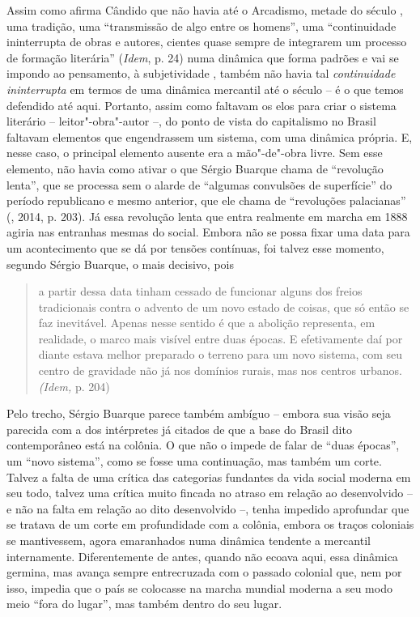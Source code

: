 Assim como afirma Cândido que não havia até o Arcadismo, metade do
século , uma tradição, uma ``transmissão de algo entre os homens'',
uma ``continuidade ininterrupta de obras e autores, cientes quase sempre
de integrarem um processo de formação literária'' (\emph{Idem}, p. 24)
numa dinâmica que forma padrões e vai se impondo ao pensamento, à
subjetividade , também não havia tal \emph{continuidade ininterrupta} em
termos de uma dinâmica mercantil até o século  -- é o que temos
defendido até aqui. Portanto, assim como faltavam os elos para criar o
sistema literário -- leitor"-obra"-autor --, do ponto de vista do
capitalismo no Brasil faltavam elementos que engendrassem um sistema,
com uma dinâmica própria. E, nesse caso, o principal elemento ausente
era a mão"-de"-obra livre. Sem esse elemento, não havia como ativar o que
Sérgio Buarque chama de ``revolução lenta'', que se processa sem o
alarde de ``algumas convulsões de superfície'' do período republicano e
mesmo anterior, que ele chama de ``revoluções palacianas'' (,
2014, p. 203). Já essa revolução lenta que entra realmente em marcha em
1888 agiria nas entranhas mesmas do social. Embora não se possa fixar
uma data para um acontecimento que se dá por tensões contínuas, foi
talvez esse momento, segundo Sérgio Buarque, o mais decisivo, pois

\begin{quote}
a partir dessa data tinham cessado de funcionar alguns dos freios
tradicionais contra o advento de um novo estado de coisas, que só então
se faz inevitável. Apenas nesse sentido é que a abolição representa, em
realidade, o marco mais visível entre duas épocas. E efetivamente daí
por diante estava melhor preparado o terreno para um novo sistema, com
seu centro de gravidade não já nos domínios rurais, mas nos centros
urbanos. \emph{(Idem,} p. 204)
\end{quote}

Pelo trecho, Sérgio Buarque parece também ambíguo -- embora sua visão
seja parecida com a dos intérpretes já citados de que a base do Brasil
dito contemporâneo está na colônia. O que não o impede de falar de
``duas épocas'', um ``novo sistema'', como se fosse uma continuação, mas
também um corte. Talvez a falta de uma crítica das categorias fundantes
da vida social moderna em seu todo, talvez uma crítica muito fincada no
atraso em relação ao desenvolvido -- e não na falta em relação ao dito
desenvolvido --, tenha impedido aprofundar que se tratava de um corte em
profundidade com a colônia, embora os traços coloniais se mantivessem,
agora emaranhados numa dinâmica tendente a mercantil internamente.
Diferentemente de antes, quando não ecoava aqui, essa dinâmica germina,
mas avança sempre entrecruzada com o passado colonial que, nem por isso,
impedia que o país se colocasse na marcha mundial moderna a seu modo
meio ``fora do lugar'', mas também dentro do seu lugar.

